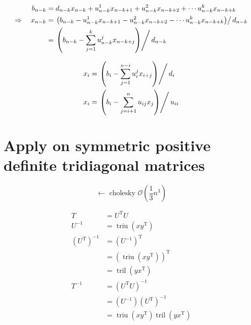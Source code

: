 \documentclass[11pt]{article}
\newcommand{\triu}{\mathop{\mathrm{triu}}}
\newcommand{\tril}{\mathop{\mathrm{tril}}}
\newcommand{\T}{\mathrm{T}}
\begin{document}
\begin{align}
    b_{n-k} &= d_{n-k} x_{n-k}+u_{n-k}^{1} x_{n-k+1}+u_{n-k}^{2} x_{n-k+2} + \cdots u_{n-k}^{k} x_{n-k+k}\\
    \Rightarrow \quad x_{n-k} &= \left.\left(b_{n-k}-u_{n-k}^{1} x_{n-k+1}-u_{n-k}^{2} x_{n-k+2} - \cdots
        u_{n-k}^{k} x_{n-k+k}\right) \right/ d_{n-k}\\
        &= \left.\left(b_{n-k}-\sum_{j=1}^{k} u_{n-k}^{j} x_{n-k+j}\right) \right/ d_{n-k} \\
\end{align}


\begin{align}
    x_{i} &= \left.\left(b_{i}-\sum_{j=1}^{n-i} u_{i}^{j} x_{i+j}\right) \right/ d_{i} \\
    x_{i} &= \left.\left(b_{i}-\sum_{j=i+1}^{n} u_{i j} x_{j}\right) \right/ u_{i i}
\end{align}





\newpage

\section{Apply on symmetric positive definite tridiagonal matrices}
$$\longleftarrow \text { cholesky } \mathcal{O}\left(\frac{1}{3} n^{3}\right)$$

\begin{align*}
    T &= U^{\T} U \\
    U^{-1} &= \triu\left(x y^{\T}\right) \\
    \left(U^{\T}\right)^{-1} &= \left(U^{-1}\right)^{\T} \\
        &=\left(\triu \left(x y^{\T}\right)\right)^{\T} \\
        &= \tril\left(y x^{\T}\right) \\
    T^{-1} &= \left(U^{\T} U\right)^{-1} \\
        &= \left(U^{-1}\right)\left(U^{\T}\right)^{-1} \\
        &= \triu \left(x y^{\T}\right) \tril \left(y x^{\T}\right) 
\end{align*}
\end{document}
